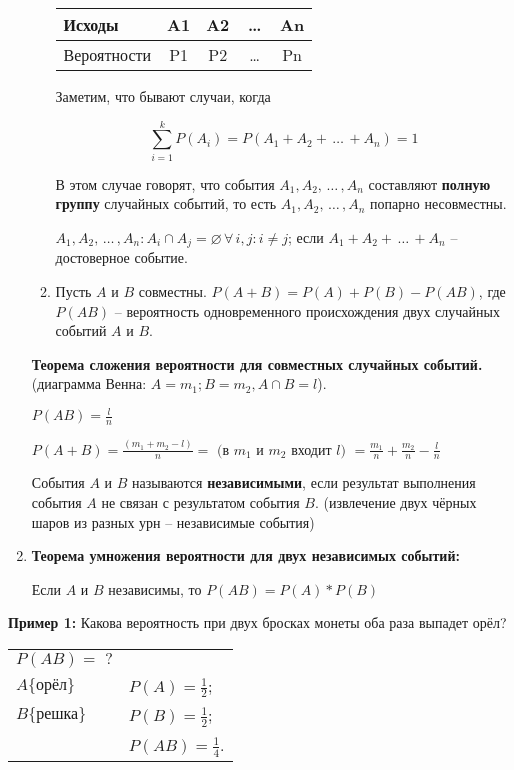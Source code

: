 \documentclass[a4paper,12pt]{report}
\newcommand*{\stitle}[1]{\rule{0pt}{15mm}\textbf{#1}}
\newcommand*{\term}[1]{\textbf{#1}}
\newcommand*{\sample}[1]{\rule{0pt}{10mm}\textbf{#1}}
\newcommand{\eset}{\varnothing}
\newcommand{\sudots}{\,\ldots\,}
\begin{document}
\begin{enumerate}
\begin{enumerate}
			\begin{tabular}{|l|c|c|c|c|}
			\hline
				Исходы & A1 & A2 & \sudots & An\\
			\hline
				Вероятности & P1 & P2 & \sudots & Pn\\
			\hline
			\end{tabular}	


			\strut Заметим, что бывают случаи, когда 

			$$
			  \sum_{i=1}^{k}P(A_i) 
			       = P(A_1+A_2+ \sudots +A_n) = 1
			$$

			В этом случае говорят, что события 
			   $A_1,A_2, \sudots ,A_n$ 
			составляют \term{полную} \linebreak \term{группу} случайных событий, то есть 
			   $A_1,A_2, \sudots ,A_n$
			попарно несовместны.

			$A_1,A_2, \sudots ,A_n : A_i \cap A_j 
			   = \eset \, \forall \, i,j: i \not= j$;
			если $A_1+A_2+ \sudots +A_n$ -- достоверное событие.


		\item	Пусть $A$ и $B$ совместны. 
			$P(A+B) = P(A)+P(B)-P(AB)$,
			где $P(AB)$ – вероятность одновременного происхождения двух случайных событий $A$ и $B$.

	\end{enumerate}			
	
	\stitle{Теорема сложения вероятности для совместных случайных событий.}
			 (диаграмма Венна: $A = m_1; B = m_2, A \cap B = l$).

			$P(AB) = \frac{l}{n}$

			$P(A+B) = \frac{(m_1+m_2-l)}{n} 
				= \mbox{ (в $m_1$ и $m_2$ входит $l$) } 
				= \frac{m_1}{n} + \frac{m_2}{n} - \frac{l}{n}$

			События $A$ и $B$ называются \term{независимыми}, если результат выполнения события $A$ не связан с результатом события $B$. (извлечение двух чёрных шаров из разных урн – независимые события)

	


	\item	\stitle{Теорема умножения вероятности для двух независимых событий:}

		Если $A$ и $B$ независимы, то $P(AB) = P(A)*P(B)$

	\end{enumerate}


	\sample{Пример 1:}  Какова вероятность при двух бросках монеты оба раза выпадет орёл?


	\begin{tabular}{ll}
	
		$P(AB) = \,\, ?$ & \\
	
		$A\mbox{\{орёл\}}$ & $ P(A) = \frac{1}{2}$;\\
	
		$B\mbox{\{решка\}}$ & $ P(B) = \frac{1}{2}$;\\
	
		& $P(AB) = \frac{1}{4}$.\\

	\end{tabular}
\end{document}
